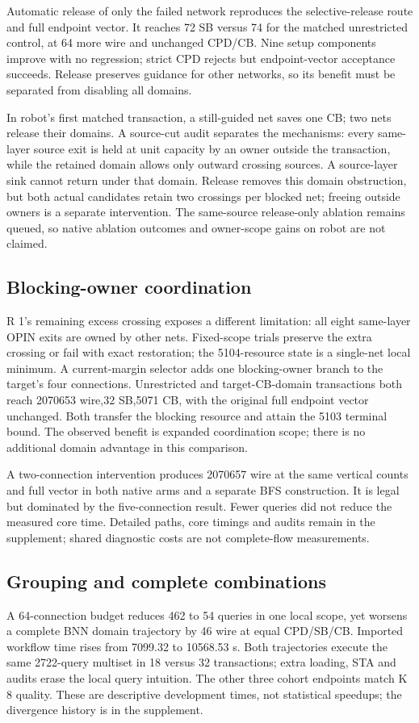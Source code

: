 \documentclass[conference,10pt]{IEEEtran}
\begin{document}
Automatic release of only the failed network reproduces the selective-release route and full endpoint vector. It reaches 72 SB versus 74 for the matched unrestricted control, at 64 more wire and unchanged CPD/CB. Nine setup components improve with no regression; strict CPD rejects but endpoint-vector acceptance succeeds. Release preserves guidance for other networks, so its benefit must be separated from disabling all domains.

In robot's first matched transaction, a still-guided net saves one CB; two nets release their domains. A source-cut audit separates the mechanisms: every same-layer source exit is held at unit capacity by an owner outside the transaction, while the retained domain allows only outward crossing sources. A source-layer sink cannot return under that domain. Release removes this domain obstruction, but both actual candidates retain two crossings per blocked net; freeing outside owners is a separate intervention. The same-source release-only ablation remains queued, so native ablation outcomes and owner-scope gains on robot are not claimed.

\subsection{Blocking-owner coordination}
R 1's remaining excess crossing exposes a different limitation: all eight same-layer OPIN exits are owned by other nets. Fixed-scope trials preserve the extra crossing or fail with exact restoration; the 5104-resource state is a single-net local minimum. A current-margin selector adds one blocking-owner branch to the target's four connections. Unrestricted and target-CB-domain transactions both reach 2070653 wire,32 SB,5071 CB, with the original full endpoint vector unchanged. Both transfer the blocking resource and attain the 5103 terminal bound. The observed benefit is expanded coordination scope; there is no additional domain advantage in this comparison.

A two-connection intervention produces 2070657 wire at the same vertical counts and full vector in both native arms and a separate BFS construction. It is legal but dominated by the five-connection result. Fewer queries did not reduce the measured core time. Detailed paths, core timings and audits remain in the supplement; shared diagnostic costs are not complete-flow measurements.

\subsection{Grouping and complete combinations}
A 64-connection budget reduces 462 to 54 queries in one local scope, yet worsens a complete BNN domain trajectory by 46 wire at equal CPD/SB/CB. Imported workflow time rises from 7099.32 to 10568.53 s. Both trajectories execute the same 2722-query multiset in 18 versus 32 transactions; extra loading, STA and audits erase the local query intuition. The other three cohort endpoints match K 8 quality. These are descriptive development times, not statistical speedups; the divergence history is in the supplement.
\end{document}
